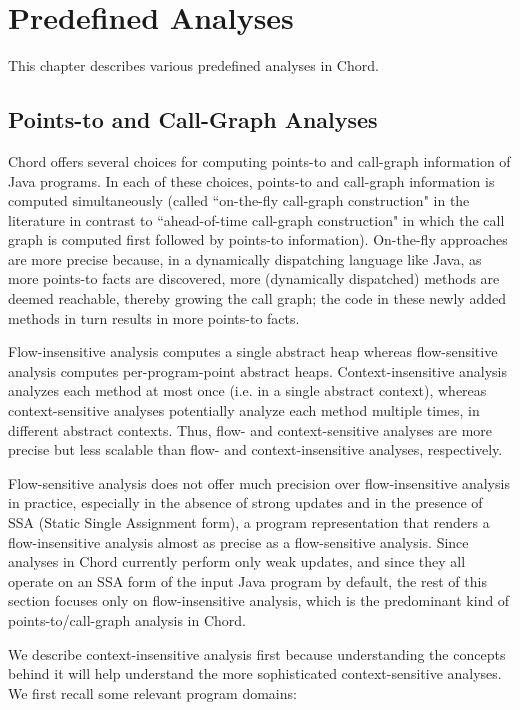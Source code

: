 \chapter{Predefined Analyses}
\label{chap:predefined-analyses}

This chapter describes various predefined analyses in Chord.

\section{Points-to and Call-Graph Analyses}

Chord offers several choices for computing points-to and call-graph information of Java programs.
In each of these choices, points-to and call-graph information is computed simultaneously
(called ``on-the-fly call-graph construction" in the literature in contrast to ``ahead-of-time call-graph
construction" in which the call graph is computed first followed by points-to information).
On-the-fly approaches are more precise because, in a dynamically dispatching language like Java,
as more points-to facts are discovered, more (dynamically dispatched) methods are deemed reachable,
thereby growing the call graph; the code in these newly added methods in turn results in more
points-to facts.

Flow-insensitive analysis computes a single abstract heap whereas flow-sensitive analysis computes
per-program-point abstract heaps.  Context-insensitive analysis analyzes each method at most once (i.e. in a single abstract context),
whereas context-sensitive analyses potentially analyze each method multiple times, in different abstract contexts.
Thus, flow- and context-sensitive analyses are more precise but less scalable than flow- and context-insensitive
analyses, respectively.

Flow-sensitive analysis does not offer much precision over flow-insensitive analysis in
practice, especially in the absence of strong updates and in the presence of SSA (Static Single Assignment form),
a program representation that renders a flow-insensitive analysis almost as precise as a flow-sensitive analysis.
Since analyses in Chord currently perform only weak updates, and since they all operate on an SSA form of the
input Java program by default, the rest of this section focuses only on flow-insensitive analysis, which is the predominant
kind of points-to/call-graph analysis in Chord.

We describe context-insensitive analysis first because understanding the concepts behind it will help understand
the more sophisticated context-sensitive analyses.
We first recall some relevant program domains:


